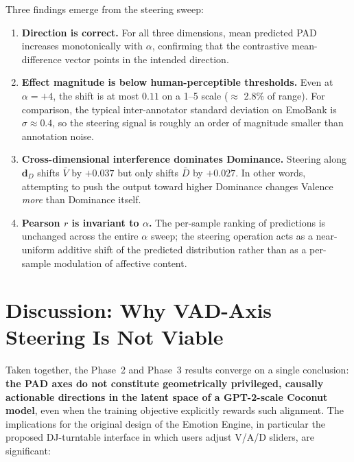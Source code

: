 \documentclass[12pt,twoside]{report}
\begin{document}
Three findings emerge from the steering sweep:
\begin{enumerate}
    \item \textbf{Direction is correct.} For all three dimensions, mean predicted PAD increases monotonically with $\alpha$, confirming that the contrastive mean-difference vector points in the intended direction.
    \item \textbf{Effect magnitude is below human-perceptible thresholds.} Even at $\alpha = +4$, the shift is at most $0.11$ on a 1--5 scale ($\approx$ 2.8\% of range). For comparison, the typical inter-annotator standard deviation on EmoBank is $\sigma \approx 0.4$, so the steering signal is roughly an order of magnitude smaller than annotation noise.
    \item \textbf{Cross-dimensional interference dominates Dominance.} Steering along $\mathbf{d}_D$ shifts $\bar{V}$ by $+0.037$ but only shifts $\bar{D}$ by $+0.027$. In other words, attempting to push the output toward higher Dominance changes Valence \emph{more} than Dominance itself.
    \item \textbf{Pearson $r$ is invariant to $\alpha$.} The per-sample ranking of predictions is unchanged across the entire $\alpha$ sweep; the steering operation acts as a near-uniform additive shift of the predicted distribution rather than as a per-sample modulation of affective content.
\end{enumerate}

\section{Discussion: Why VAD-Axis Steering Is Not Viable}

Taken together, the Phase~2 and Phase~3 results converge on a single conclusion: \textbf{the PAD axes do not constitute geometrically privileged, causally actionable directions in the latent space of a GPT-2-scale Coconut model}, even when the training objective explicitly rewards such alignment.
The implications for the original design of the Emotion Engine, in particular the proposed DJ-turntable interface in which users adjust V/A/D sliders, are significant:
\end{document}
